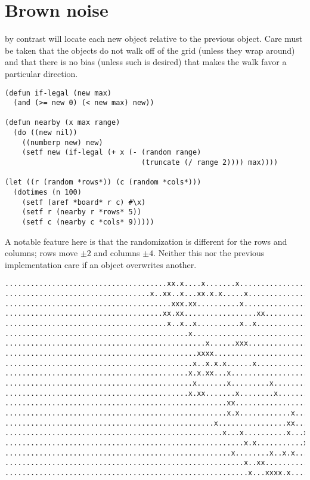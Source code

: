 \documentclass[12pt,a4paper]{article}
\begin{document}
\section*{Brown noise}

by contrast will locate each new object relative to the previous object.
Care must be taken that the objects do not walk off of the grid (unless
they wrap around) and that there is no bias (unless such is desired)
that makes the walk favor a particular direction.

\begin{verbatim}
(defun if-legal (new max)
  (and (>= new 0) (< new max) new))

(defun nearby (x max range)
  (do ((new nil))
    ((numberp new) new)
    (setf new (if-legal (+ x (- (random range)
                                (truncate (/ range 2)))) max))))

(let ((r (random *rows*)) (c (random *cols*)))
  (dotimes (n 100)
    (setf (aref *board* r c) #\x)
    (setf r (nearby r *rows* 5))
    (setf c (nearby c *cols* 9)))))
\end{verbatim}

A notable feature here is that the randomization is different for the
rows and columns; rows move $\pm 2$ and columns $\pm 4$. Neither this
nor the previous implementation care if an object overwrites another.

\begin{verbatim}
......................................xx.x....x.......x.................
..................................x..xx..x...xx.x.x.....x...............
.......................................xxx.xx..........x................
.....................................xx.xx.................xx...........
......................................x..x..x..........x..x.............
...........................................x............................
...............................................x......xxx...............
.............................................xxxx.......................
............................................x..x.x.x......x.............
...........................................x.x.xx...x...................
............................................x.......x.........x.........
...........................................x.xx.......x........x........
....................................................xx..................
....................................................x.x............x....
.................................................x................xx....
...................................................x...x..........x...x.
........................................................x.x...........x.
.....................................................x........x..x.x....
........................................................x..xx...........
.........................................................x...xxxx.x.....
\end{verbatim}
\end{document}

